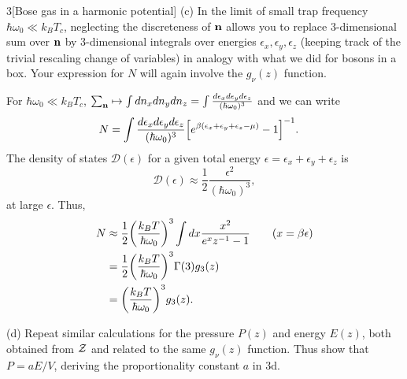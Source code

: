 \documentclass[12pt]{article}
\begin{document}
\begin{problem}{3}[Bose gas in a harmonic potential]
(c) In the limit of small trap frequency $\hbar\omega_0\ll k_BT_c$, neglecting
the discreteness of $\vb{n}$ allows you to replace 3-dimensional sum over
$\vb{n}$ by 3-dimensional integrals over energies
$\epsilon_x,\epsilon_y,\epsilon_z$ (keeping track of the trivial rescaling
change of variables) in analogy with what we did for bosons in a box. Your
expression for $N$ will again involve the $g_\nu(z)$ function.
\begin{solution}
For $\hbar\omega_0\ll k_BT_c$, $\sum_{\vb{n}}\mapsto \int
dn_xdn_ydn_z=\int\frac{d\epsilon_x d\epsilon_y d\epsilon_z}{(\hbar\omega_0)^3}$
and we can write
\begin{align}
    N
    &=\int\frac{d\epsilon_xd\epsilon_yd\epsilon_z}{(\hbar\omega_0)^3}\qty[e^{\beta(\epsilon_x+\epsilon_y+\epsilon_z-\mu)}-1]^{-1}.
\end{align}
The density of states $\mathcal{D}(\epsilon)$ for a given total energy
$\epsilon=\epsilon_x+\epsilon_y+\epsilon_z$ is
\begin{equation}
    \mathcal{D}(\epsilon)\approx\frac12\frac{\epsilon^2}{(\hbar\omega_0)^3},
\end{equation}
at large $\epsilon$. Thus,
\begin{align}
    N&\approx
    \frac12\qty(\frac{k_BT}{\hbar\omega_0})^3\int
    dx\frac{x^2}{e^xz^{-1}-1}\tag{$x=\beta\epsilon$}\\
     &=\frac12\qty(\frac{k_BT}{\hbar\omega_0})^3\Gamma(3)g_3(z)\notag\\
     &=\qty(\frac{k_BT}{\hbar\omega_0})^3g_3(z).
\end{align}
\end{solution}

(d) Repeat similar calculations for the pressure $P(z)$ and energy $E(z)$, both
obtained from $\mathcal{Z}$ and related to the same $g_\nu(z)$ function. Thus show that
$P=aE/V$, deriving the proportionality constant $a$ in 3d.


\end{problem}
\end{document}
